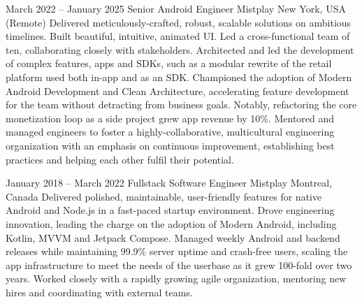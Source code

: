 \documentclass[10pt,a4paper,sans]{moderncv} %
\newcommand{\vs}[0]{\smallskip}
\begin{document}
\cventry
{March 2022 -- January 2025}
{Senior Android Engineer}
{{Mistplay}}
{New York, USA (Remote)}
{}{
	Delivered meticulously-crafted, robust, scalable solutions on ambitious timelines. Built beautiful, intuitive, animated UI.
	Led a cross-functional team of ten, collaborating closely with stakeholders.
	Architected and led the development of complex features, apps and SDKs, such as a modular rewrite of the retail platform used both in-app and as an SDK.
	Championed the adoption of Modern Android Development and Clean Architecture, accelerating feature development for the team without detracting from business goals. Notably, refactoring the core monetization loop as a side project grew app revenue by 10\%.
	Mentored and managed engineers to foster a highly-collaborative, multicultural engineering organization with an emphasis on continuous improvement, establishing best practices and helping each other fulfil their potential.
}\vs

\cventry
{January 2018 -- March 2022}
{Fullstack Software Engineer}
{{Mistplay}}
{Montreal, Canada}
{}
{
	Delivered polished, maintainable, user-friendly features for native Android and Node.js in a fast-paced startup environment.
	Drove engineering innovation, leading the charge on the adoption of Modern Android, including Kotlin, MVVM and Jetpack Compose.
	Managed weekly Android and backend releases while maintaining 99.9\% server uptime and crash-free users, scaling the app infrastructure to meet the needs of the userbase as it grew 100-fold over two years.
	Worked closely with a rapidly growing agile organization, mentoring new hires and coordinating with external teams.
}\vs

\vs


\end{document}
